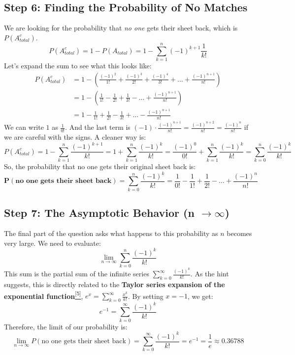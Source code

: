 \documentclass[11pt,a4paper]{article}
\begin{document}
\subsection{Step 6: Finding the Probability of No Matches}
We are looking for the probability that \textit{no one} gets their sheet back, which is $P(A_{total}^c)$.
\[
    P(A_{total}^c) = 1 - P(A_{total}) = 1 - \sum_{k=1}^n (-1)^{k+1} \frac{1}{k!}
\]
Let's expand the sum to see what this looks like:
\begin{align*}
    P(A_{total}^c) &= 1 - \left( \frac{(-1)^2}{1!} + \frac{(-1)^3}{2!} + \frac{(-1)^4}{3!} + \dots + \frac{(-1)^{n+1}}{n!} \right) \\
    &= 1 - \left( \frac{1}{1!} - \frac{1}{2!} + \frac{1}{3!} - \dots + \frac{(-1)^{n+1}}{n!} \right) \\
    &= 1 - \frac{1}{1!} + \frac{1}{2!} - \frac{1}{3!} + \dots - \frac{(-1)^{n+1}}{n!}
\end{align*}
We can write $1$ as $\frac{1}{0!}$. And the last term is $(-1) \cdot \frac{(-1)^{n+1}}{n!} = \frac{(-1)^{n+2}}{n!} = \frac{(-1)^n}{n!}$ if we are careful with the signs. A cleaner way is:
\[
    P(A_{total}^c) = 1 - \sum_{k=1}^n \frac{(-1)^{k+1}}{k!} = 1 + \sum_{k=1}^n \frac{(-1)^{k}}{k!} = \frac{(-1)^0}{0!} + \sum_{k=1}^n \frac{(-1)^{k}}{k!} = \sum_{k=0}^n \frac{(-1)^{k}}{k!}
\]
So, the probability that no one gets their original sheet back is:
\[
    \mathbf{P(\text{no one gets their sheet back})} = \sum_{k=0}^n \frac{(-1)^k}{k!} = \frac{1}{0!} - \frac{1}{1!} + \frac{1}{2!} - \dots + \frac{(-1)^n}{n!}
\]

\subsection{Step 7: The Asymptotic Behavior (n $\to \infty$)}
The final part of the question asks what happens to this probability as $n$ becomes very large. We need to evaluate:
\[
    \lim_{n\to\infty} \sum_{k=0}^n \frac{(-1)^k}{k!}
\]
This sum is the partial sum of the infinite series $\sum_{k=0}^\infty \frac{(-1)^k}{k!}$. As the hint suggests, this is directly related to the \textbf{Taylor series expansion of the exponential function}\hyperlink{note:taylor}{\textsuperscript{[5]}}, $e^x = \sum_{k=0}^\infty \frac{x^k}{k!}$.
By setting $x = -1$, we get:
\[
    e^{-1} = \sum_{k=0}^\infty \frac{(-1)^k}{k!}
\]
Therefore, the limit of our probability is:
\[
    \lim_{n\to\infty} P(\text{no one gets their sheet back}) = \sum_{k=0}^\infty \frac{(-1)^k}{k!} = e^{-1} = \frac{1}{e} \approx 0.36788
\]
\end{document}
